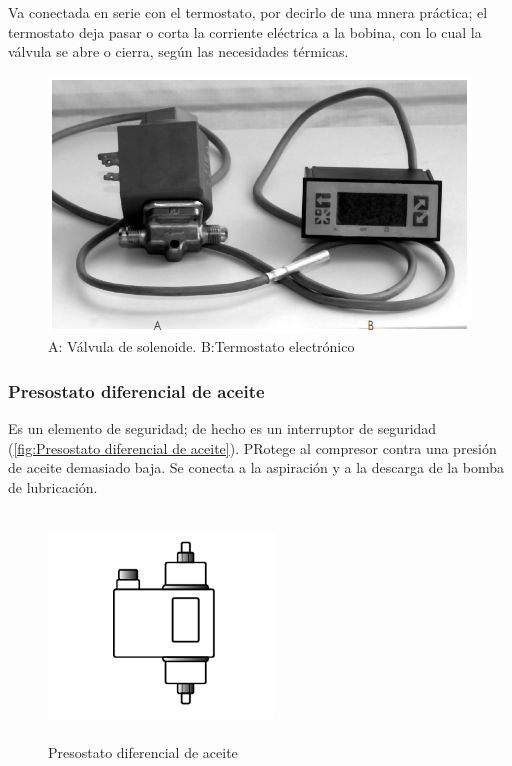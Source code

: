 Va conectada en serie con el termostato, por decirlo de una mnera práctica; el termostato deja pasar o corta la corriente eléctrica a la bobina, con lo cual la válvula se abre o cierra, según las necesidades térmicas.


\begin{figure}[H]
	\centering
	\includegraphics[width=\textwidth]{figuras/solenoide y termometro.png}
	\caption{A: Válvula de solenoide. B:Termostato electrónico}
	\label{fig:solenoide y termostato}
\end{figure}

\subsubsection{Presostato diferencial de aceite}

Es un elemento de seguridad; de hecho es un interruptor de seguridad (\autoref{fig:Presostato diferencial de aceite}). PRotege al compresor contra una presión de aceite demasiado baja. Se conecta a la aspiración y a la descarga de la bomba de lubricación.

\begin{figure}[H]
	\centering
	\includegraphics[width=6cm, height=6cm]{figuras/Presostato diferencial de aceite.png}
	\caption{Presostato diferencial de aceite}
	\label{fig:Presostato diferencial de aceite}
\end{figure}

